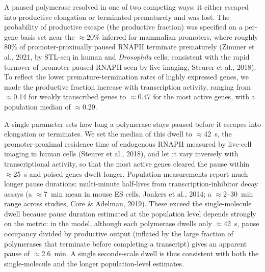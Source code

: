 \documentclass[11pt]{article}
\begin{document}
A paused polymerase resolved in one of two competing ways: it either escaped into
productive elongation or terminated prematurely and was lost. The probability of
productive escape (the productive fraction) was specified on a per-gene basis set
near the $\approx$20\% inferred for mammalian promoters, where roughly 80\% of
promoter-proximally paused RNAPII terminate prematurely (Zimmer et al., 2021, by
STL-seq in human and \emph{Drosophila} cells; consistent with the
rapid turnover of promoter-paused RNAPII seen by live imaging, Steurer et al., 2018).
To reflect the lower premature-termination rates of highly expressed genes, we made
the productive fraction increase with transcription activity, ranging from
$\approx$0.14 for weakly transcribed genes to $\approx$0.47 for the most active genes,
with a population median of $\approx$0.29.

A single parameter sets how long a polymerase stays paused before it escapes into
elongation or terminates. We set the median of this dwell to $\approx$42~s, the promoter-proximal
residence time of endogenous RNAPII measured by live-cell imaging in human cells
(Steurer et al., 2018), and let it vary inversely with transcriptional activity, so that
the most active genes cleared the pause within $\approx$25~s and poised genes dwelt
longer. Population measurements report much longer pause durations: multi-minute
half-lives from transcription-inhibitor decay assays (a $\approx$7~min mean in mouse ES
cells, Jonkers et al., 2014; a $\approx$2--30~min range across studies, Core \& Adelman,
2019). These exceed the single-molecule dwell because pause duration estimated at the
population level depends strongly on the metric: in the model, although each polymerase
dwells only $\approx$42~s, pause occupancy divided by productive output (inflated by
the large fraction of polymerases that terminate before completing a transcript)
gives an apparent pause of $\approx$2.6~min. A single seconds-scale dwell is thus
consistent with both the single-molecule and the longer population-level estimates.
\end{document}
